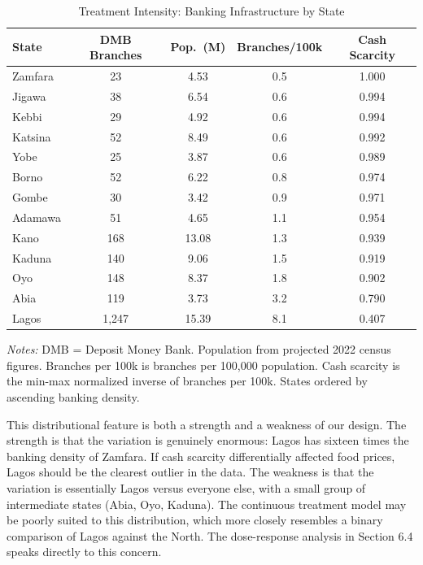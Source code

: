 \documentclass[12pt]{article}
\begin{document}
\begin{table}[H]
\centering
\caption{Treatment Intensity: Banking Infrastructure by State}
\begin{threeparttable}
\begin{tabular}{lcccc}
\toprule
State & DMB Branches & Pop.\ (M) & Branches/100k & Cash Scarcity \\
\midrule
Zamfara & 23 & 4.53 & 0.5 & 1.000 \\
Jigawa & 38 & 6.54 & 0.6 & 0.994 \\
Kebbi & 29 & 4.92 & 0.6 & 0.994 \\
Katsina & 52 & 8.49 & 0.6 & 0.992 \\
Yobe & 25 & 3.87 & 0.6 & 0.989 \\
Borno & 52 & 6.22 & 0.8 & 0.974 \\
Gombe & 30 & 3.42 & 0.9 & 0.971 \\
Adamawa & 51 & 4.65 & 1.1 & 0.954 \\
Kano & 168 & 13.08 & 1.3 & 0.939 \\
Kaduna & 140 & 9.06 & 1.5 & 0.919 \\
Oyo & 148 & 8.37 & 1.8 & 0.902 \\
Abia & 119 & 3.73 & 3.2 & 0.790 \\
Lagos & 1,247 & 15.39 & 8.1 & 0.407 \\
\bottomrule
\end{tabular}
\begin{tablenotes}[flushleft]
\small
\item \textit{Notes:} DMB = Deposit Money Bank. Population from projected 2022 census figures. Branches per 100k is branches per 100,000 population. Cash scarcity is the min-max normalized inverse of branches per 100k. States ordered by ascending banking density.
\end{tablenotes}
\end{threeparttable}
\label{tab:treatment}
\end{table}

This distributional feature is both a strength and a weakness of our design. The strength is that the variation is genuinely enormous: Lagos has sixteen times the banking density of Zamfara. If cash scarcity differentially affected food prices, Lagos should be the clearest outlier in the data. The weakness is that the variation is essentially Lagos versus everyone else, with a small group of intermediate states (Abia, Oyo, Kaduna). The continuous treatment model may be poorly suited to this distribution, which more closely resembles a binary comparison of Lagos against the North. The dose-response analysis in Section 6.4 speaks directly to this concern.
\end{document}
